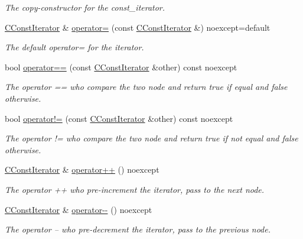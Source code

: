 \begin{DoxyCompactItemize}
\begin{DoxyCompactList}\small\item\em The copy-\/constructor for the const\+\_\+iterator. \end{DoxyCompactList}\item 
\hyperlink{structnsSdD_1_1CList_1_1CConstIterator}{C\+Const\+Iterator} \& \hyperlink{structnsSdD_1_1CList_1_1CConstIterator_a5bcf62e3feee5725386ec2fd74ad9f7a}{operator=} (const \hyperlink{structnsSdD_1_1CList_1_1CConstIterator}{C\+Const\+Iterator} \&) noexcept=default
\begin{DoxyCompactList}\small\item\em The default operator= for the iterator. \end{DoxyCompactList}\item 
bool \hyperlink{structnsSdD_1_1CList_1_1CConstIterator_a00009d64b32bb3b29f95629d87289749}{operator==} (const \hyperlink{structnsSdD_1_1CList_1_1CConstIterator}{C\+Const\+Iterator} \&other) const noexcept
\begin{DoxyCompactList}\small\item\em The operator == who compare the two node and return true if equal and false otherwise. \end{DoxyCompactList}\item 
bool \hyperlink{structnsSdD_1_1CList_1_1CConstIterator_a11e78574976270f6360da8df191530a7}{operator!=} (const \hyperlink{structnsSdD_1_1CList_1_1CConstIterator}{C\+Const\+Iterator} \&other) const noexcept
\begin{DoxyCompactList}\small\item\em The operator != who compare the two node and return true if not equal and false otherwise. \end{DoxyCompactList}\item 
\hyperlink{structnsSdD_1_1CList_1_1CConstIterator}{C\+Const\+Iterator} \& \hyperlink{structnsSdD_1_1CList_1_1CConstIterator_a307985e2d8e6dc496d366de8a3ca624a}{operator++} () noexcept
\begin{DoxyCompactList}\small\item\em The operator ++ who pre-\/increment the iterator, pass to the next node. \end{DoxyCompactList}\item 
\hyperlink{structnsSdD_1_1CList_1_1CConstIterator}{C\+Const\+Iterator} \& \hyperlink{structnsSdD_1_1CList_1_1CConstIterator_af9d0e9415ed4b6a5735feb22e421ef69}{operator-\/-\/} () noexcept
\begin{DoxyCompactList}\small\item\em The operator -- who pre-\/decrement the iterator, pass to the previous node. \end{DoxyCompactList}\item 

\end{DoxyCompactItemize}
